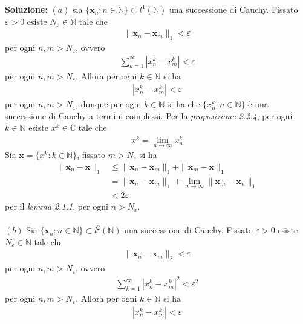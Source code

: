 \documentclass{article}
\numberwithin{equation}{subsection}
\begin{document}
\textbf{Soluzione:} $(a)$ sia $\{\mathbf{x}_n : n \in \mathbb{N}\} \subset l^1(\mathbb{N})$ una successione di Cauchy. Fissato $\varepsilon > 0$ esiste $N_\varepsilon \in \mathbb{N}$ tale che
\begin{align*}
    \|\mathbf{x}_n - \mathbf{x}_m\|_1 < \varepsilon 
\end{align*}
per ogni $n, m > N_\varepsilon$, ovvero
\begin{align*}
    \sum_{k = 1}^\infty |x^k_n - x^k_m| < \varepsilon 
\end{align*}
per ogni $n, m > N_\varepsilon$. Allora per ogni $k \in \mathbb{N}$ si ha
\begin{align*}
    |x^k_n - x^k_m| < \varepsilon 
\end{align*}
per ogni $n, m > N_\varepsilon$, dunque per ogni $k \in \mathbb{N}$ si ha che $\{x^k_n : n \in \mathbb{N}\}$ è una successione di Cauchy a termini complessi. Per la \textit{proposizione 2.2.4}, per ogni $k \in \mathbb{N}$ esiste $x^k \in \mathbb{C}$ tale che 
\begin{align*}
    x^k = \lim_{n \rightarrow \infty} x^k_n 
\end{align*}
Sia $\mathbf{x} = \{x^k : k \in \mathbb{N}\}$, fissato $m > N_\varepsilon$ si ha
\begin{align*}
    \|\mathbf{x}_n - \mathbf{x}\|_1 &\leq \|\mathbf{x}_n - \mathbf{x}_m\|_1 + \|\mathbf{x}_m - \mathbf{x}\|_1  \\
    &= \|\mathbf{x}_n - \mathbf{x}_m\|_1 + \lim_{n \rightarrow \infty}\|\mathbf{x}_m - \mathbf{x}_n\|_1  \\
    &< 2\varepsilon 
\end{align*}
per il \textit{lemma 2.1.1}, per ogni $n > N_\varepsilon$. \\ \\
$(b)$ Sia $\{\mathbf{x}_n : n \in \mathbb{N}\} \subset l^2(\mathbb{N})$ una successione di Cauchy. Fissato $\varepsilon > 0$ esiste $N_\varepsilon \in \mathbb{N}$ tale che 
\begin{align*}
    \|\mathbf{x}_n - \mathbf{x}_m\|_2 < \varepsilon 
\end{align*} 
per ogni $n, m > N_\varepsilon$, ovvero
\begin{align*}
    \sum_{k = 1}^\infty|x^k_n - x^k_m|^2 < \varepsilon^2 
\end{align*}
per ogni $n, m > N_\varepsilon$. Allora per ogni $k \in \mathbb{N}$ si ha
\begin{align*}
    |x^k_n - x^k_m| < \varepsilon 
\end{align*}
\end{document}
